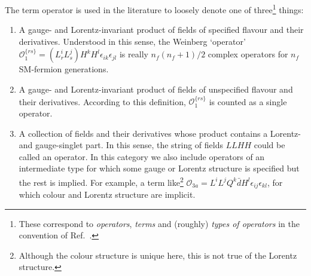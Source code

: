 The term operator is used in the literature to loosely denote one of
three\footnote{These correspond to \textit{operators}, \textit{terms} and
  (roughly) \textit{types of operators} in the convention of
  Ref.~\cite{Fonseca:2019yya}.} things:
\begin{enumerate}
  \item A gauge- and Lorentz-invariant product of fields of specified flavour
  and their derivatives. Understood in this sense, the Weinberg `operator'
  $\mathcal{O}_{1}^{\{rs\}} = (L_{r}^{i}L_{s}^{j})H^{k}H^{l}\epsilon_{ik}\epsilon_{jl}$
  is really $n_{f}(n_{f}+1)/2$ complex operators for $n_{f}$ SM-fermion
  generations.
  \item A gauge- and Lorentz-invariant product of fields of unspecified flavour
  and their derivatives. According to this definition,
  $\mathcal{O}_{1}^{\{rs\}}$ is counted as a single operator.
  \item A collection of fields and their derivatives whose product contains a
  Lorentz- and gauge-singlet part. In this sense, the string of fields $LLHH$
  could be called an operator. In this category we also include operators of
  an intermediate type for which some gauge or Lorentz structure is specified
  but the rest is implied. For example, a term like\footnote{Although the
    colour structure is unique here, this is not true of the Lorentz structure.}
  $\mathcal{O}_{3a} = L^{i}L^{j}Q^{k}\bar{d}H^{l} \epsilon_{ij}\epsilon_{kl}$,
  for which colour and Lorentz structure are implicit.
\end{enumerate}

